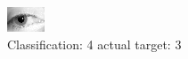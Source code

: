 \begin{figure}[h!]
\begin{center}
\includegraphics[width=0.60\columnwidth]{figures/ID1320_class_4_target_3.png}
\end{center}
\caption{ Classification: 4 actual target: 3}
\label{fig:ID1320_class_4_target_3}
\end{figure}
